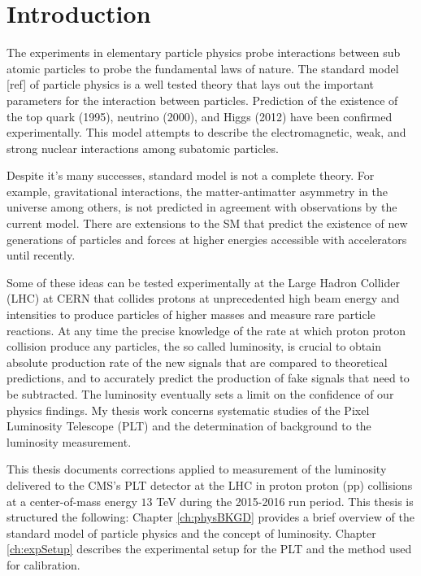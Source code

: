 \chapter{Introduction} \label{ch:Introduction}
The experiments in elementary particle physics probe interactions between sub atomic particles to probe the fundamental laws of nature. The standard model [ref] of particle physics is a well tested theory that lays out the important parameters for the interaction between particles. Prediction of the existence of the top quark (1995), neutrino (2000), and Higgs (2012) have been confirmed experimentally. This model attempts to describe the electromagnetic, weak, and strong nuclear interactions among subatomic particles.%

Despite it's many successes, standard model is not a complete theory. For example, gravitational interactions, the matter-antimatter asymmetry in the universe among others, is not predicted in agreement with observations by the current model. There are extensions to the SM that predict the existence of new generations of particles and forces at higher energies accessible with accelerators until recently. 

Some of these ideas can be tested experimentally at the Large Hadron Collider (LHC) at CERN that collides protons at unprecedented high beam energy and intensities to produce particles of higher masses and measure rare particle reactions. At any time the precise knowledge of the rate at which proton proton collision produce any particles, the so called luminosity, is crucial to obtain absolute production rate of the new signals that are compared to theoretical predictions, and to accurately predict the production of fake signals that need to be subtracted.
The luminosity eventually sets a limit on the confidence of our physics findings. My thesis work concerns systematic studies of the Pixel Luminosity Telescope (PLT) and the determination of background to the luminosity measurement.

This thesis documents corrections applied to measurement of the luminosity delivered to the CMS's PLT detector at the LHC in proton proton (pp) collisions at a center-of-mass energy $13$ TeV during the 2015-2016 run period. This thesis is structured the following: Chapter \ref{ch:physBKGD} provides a brief overview of the standard model of particle physics and the concept of luminosity. Chapter \ref{ch:expSetup} describes the experimental setup for the PLT and the method used for calibration.

